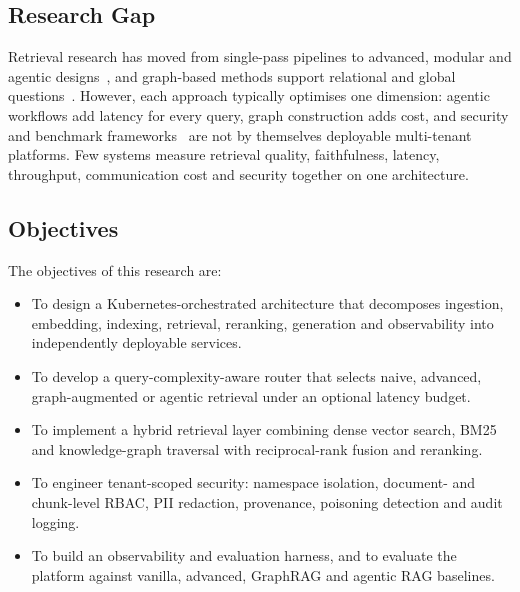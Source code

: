 \documentclass[journal]{IEEEtran}
\begin{document}
\subsection{Research Gap}
Retrieval research has moved from single-pass pipelines to advanced, modular and agentic
designs~\cite{fan2024survey}, and graph-based methods support relational and global
questions~\cite{edge2024graphrag,barron2024domain}. However, each approach typically optimises one
dimension: agentic workflows add latency for every query, graph construction adds cost, and security and
benchmark frameworks~\cite{ammann2025securing,upadhyay2025trec} are not by themselves deployable
multi-tenant platforms. Few systems measure retrieval quality, faithfulness, latency, throughput,
communication cost and security together on one architecture.

\subsection{Objectives}
The objectives of this research are:
\begin{itemize}
    \item To design a Kubernetes-orchestrated architecture that decomposes ingestion, embedding, indexing,
          retrieval, reranking, generation and observability into independently deployable services.
    \item To develop a query-complexity-aware router that selects naive, advanced, graph-augmented or
          agentic retrieval under an optional latency budget.
    \item To implement a hybrid retrieval layer combining dense vector search, BM25 and knowledge-graph
          traversal with reciprocal-rank fusion and reranking.
    \item To engineer tenant-scoped security: namespace isolation, document- and chunk-level RBAC, PII
          redaction, provenance, poisoning detection and audit logging.
    \item To build an observability and evaluation harness, and to evaluate the platform against vanilla,
          advanced, GraphRAG and agentic RAG baselines.
\end{itemize}
\end{document}
